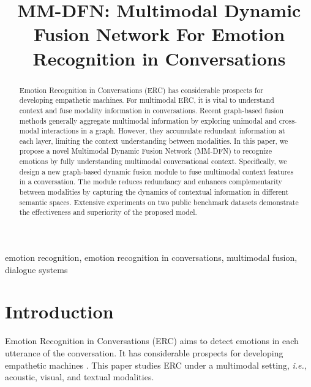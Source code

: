 \title{MM-DFN: Multimodal Dynamic Fusion Network For Emotion Recognition in Conversations}



\maketitle
\begin{abstract}

  Emotion Recognition in Conversations (ERC) has considerable prospects for developing empathetic machines. For multimodal ERC, it is vital to understand context and fuse modality information in conversations. Recent graph-based fusion methods generally aggregate multimodal information by exploring unimodal and cross-modal interactions in a graph. However, they accumulate redundant information at each layer, limiting the context understanding between modalities. In this paper, we propose a novel Multimodal Dynamic Fusion Network (MM-DFN) to recognize emotions by fully understanding multimodal conversational context. Specifically, we design a new graph-based dynamic fusion module to fuse multimodal context features in a conversation.  The module reduces redundancy and enhances complementarity between modalities by capturing the dynamics of contextual information in different semantic spaces. Extensive experiments on two public benchmark datasets demonstrate the effectiveness and superiority of the proposed model. 
\end{abstract}

\begin{keywords}
emotion recognition, emotion recognition in conversations, multimodal fusion, dialogue systems
\end{keywords}

\section{Introduction}
\label{sec:intro}
Emotion Recognition in Conversations (ERC) aims to detect emotions in each utterance of the conversation.  %
It has considerable prospects for developing empathetic machines \cite{DBLP:journals/inffus/MaNXC20}.
This paper studies ERC under a multimodal setting,
\textit{i.e.}, acoustic, visual, and textual modalities. %

